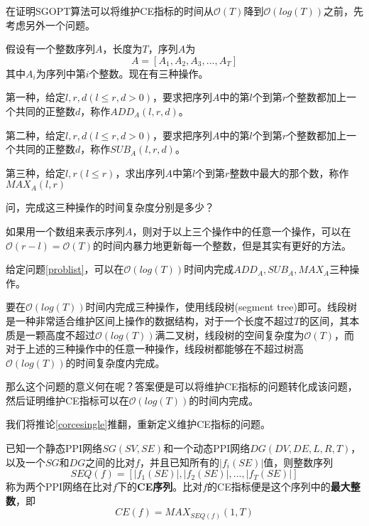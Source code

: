 在证明SGOPT算法可以将维护CE指标的时间从$\mathcal{O}(T)$降到$\mathcal{O}(log(T))$之前，先考虑另外一个问题。

\begin{prob}[整数序列问题]
\label{problist}
假设有一个整数序列$A$，长度为$T$，序列$A$为
\begin{equation*}   
A=[A_1,A_2,A_3,...,A_T]
\end{equation*}
其中$A_i$为序列中第$i$个整数。现在有三种操作。

第一种，给定$l,r,d(l\leq r,d>0)$，要求把序列$A$中的第$l$个到第$r$个整数都加上一个共同的正整数$d$，称作$ADD_A(l,r,d)$。

第二种，给定$l,r,d(l\leq r,d>0)$，要求把序列$A$中的第$l$个到第$r$个整数都加上一个共同的正整数$d$，称作$SUB_A(l,r,d)$。

第三种，给定$l,r(l\leq r)$，求出序列$A$中第$l$个到第$r$整数中最大的那个数，称作$MAX_A(l,r)$

问，完成这三种操作的时间复杂度分别是多少？
\end{prob}

如果用一个数组来表示序列$A$，则对于以上三个操作中的任意一个操作，可以在$\mathcal{O}(r-l)=\mathcal{O}(T)$的时间内暴力地更新每一个整数，但是其实有更好的方法。

\begin{lem}
\label{lemlistsg}
给定问题\ref{problist}，可以在$\mathcal{O}(log(T))$时间内完成$ADD_A,SUB_A,MAX_A$三种操作。
\end{lem}
\begin{proof2}
要在$\mathcal{O}(log(T))$时间内完成三种操作，使用线段树(segment tree)即可。线段树\cite{de2000computational}是一种非常适合维护区间上操作的数据结构，对于一个长度不超过$T$的区间，其本质是一颗高度不超过$\mathcal{O}(log(T))$满二叉树，线段树的空间复杂度为$\mathcal{O}(T)$，而对于上述的三种操作中的任意一种操作，线段树都能够在不超过树高$\mathcal{O}(log(T))$的时间复杂度内完成。
\end{proof2}

那么这个问题的意义何在呢？答案便是可以将维护CE指标的问题转化成该问题，然后证明维护CE指标可以在$\mathcal{O}(log(T))$的时间内完成。

我们将推论\ref{corcesingle}推翻，重新定义维护CE指标的问题。

\begin{defn}[比对$f$的CE序列]
\label{defnfseq}
已知一个静态PPI网络$SG(SV,SE)$和一个动态PPI网络$DG(DV,DE,L,R,T)$，以及一个$SG$和$DG$之间的比对$f$，并且已知所有的$|f_i(SE)|$值，则整数序列$$SEQ(f)=[|f_1(SE)|,|f_2(SE)|,...,|f_T(SE)|]$$称为两个PPI网络在比对$f$下的\textbf{CE序列}。比对$f$的CE指标便是这个序列中的\textbf{最大整数}，即$$CE(f)=MAX_{SEQ(f)}(1,T)$$
\end{defn}

